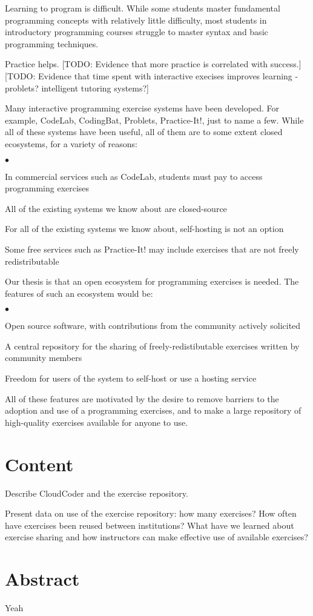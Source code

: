 \documentclass[11pt]{article}
\newenvironment{denseItemize}{%
\begin{list}{$\bullet$}{\setlength{\itemsep}{0in}\setlength{\parsep}{.05in}}}{\end{list}}
\begin{document}
Learning to program is difficult.  While some students master
fundamental programming concepts with relatively little difficulty,
most students in introductory programming courses struggle
to master syntax and basic programming techniques.

Practice helps.  [TODO: Evidence that more practice is correlated with
success.]  [TODO: Evidence that time spent with interactive execises
improves learning - problets? intelligent tutoring systems?]

Many interactive programming exercise systems have been developed.
For example, CodeLab, CodingBat, Problets, Practice-It!, just to
name a few.  While all of these systems have been useful, all of
them are to some extent closed ecosystems, for a variety of reasons:

\begin{denseItemize}
\item In commercial services such as CodeLab,
      students must pay to access programming exercises
\item All of the existing systems we know about are closed-source
\item For all of the existing systems we know about,
      self-hosting is not an option
\item Some free services such as Practice-It! may include
      exercises that are not freely redistributable
\end{denseItemize}

Our thesis is that an open ecosystem for programming exercises
is needed.  The features of such an ecosystem would be:

\begin{denseItemize}
\item Open source software, with contributions from the community
      actively solicited
\item A central repository for the sharing of freely-redistibutable exercises
      written by community members
\item Freedom for users of the system to self-host or use a hosting service
\end{denseItemize}

All of these features are motivated by the desire to remove 
barriers to the adoption and use of a programming exercises,
and to make a large repository of high-quality exercises available
for anyone to use.

\section*{Content}

Describe CloudCoder and the exercise repository.

Present data on use of the exercise repository: how many exercises? How often have exercises
been reused between institutions?  What have we learned about exercise sharing and how
instructors can make effective use of available exercises?

\section*{Abstract}

Yeah
\end{document}
